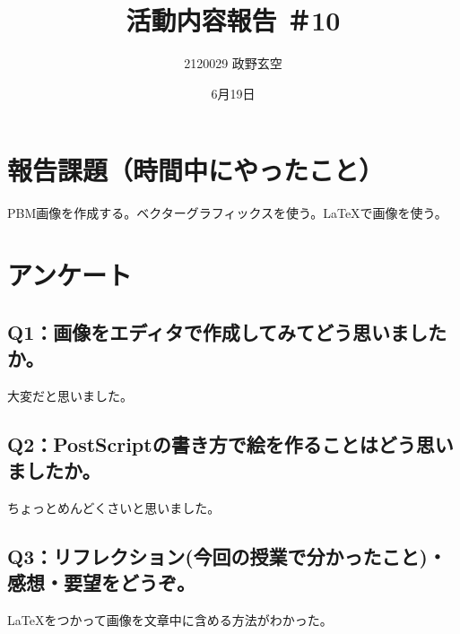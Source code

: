 \documentclass[12pt,a4j]{jarticle}
\begin{document}
\title{活動内容報告 ＃10}
\author{2120029 政野玄空}
\date{6月19日}
\maketitle

\section{報告課題（時間中にやったこと）}
PBM画像を作成する。ベクターグラフィックスを使う。LaTeXで画像を使う。




\section{アンケート}

\subsection{Q1：画像をエディタで作成してみてどう思いましたか。}
大変だと思いました。
\subsection{Q2：PostScriptの書き方で絵を作ることはどう思いましたか。}
ちょっとめんどくさいと思いました。
\subsection{Q3：リフレクション(今回の授業で分かったこと)・感想・要望をどうぞ。}
LaTeXをつかって画像を文章中に含める方法がわかった。
\end{document}
